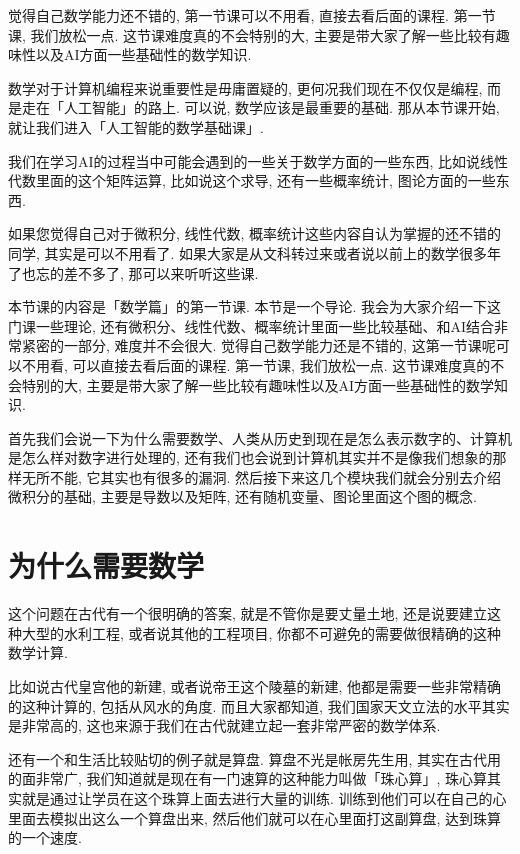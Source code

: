 觉得自己数学能力还不错的, 第一节课可以不用看, 直接去看后面的课程. 第一节课, 我们放松一点. 这节课难度真的不会特别的大, 主要是带大家了解一些比较有趣味性以及AI方面一些基础性的数学知识. 

数学对于计算机编程来说重要性是毋庸置疑的, 更何况我们现在不仅仅是编程, 而是走在「人工智能」的路上. 可以说, 数学应该是最重要的基础. 那从本节课开始, 就让我们进入「人工智能的数学基础课」. 

我们在学习AI的过程当中可能会遇到的一些关于数学方面的一些东西, 比如说线性代数里面的这个矩阵运算, 比如说这个求导, 还有一些概率统计, 图论方面的一些东西. 

如果您觉得自己对于微积分, 线性代数, 概率统计这些内容自认为掌握的还不错的同学, 其实是可以不用看了. 如果大家是从文科转过来或者说以前上的数学很多年了也忘的差不多了, 那可以来听听这些课. 

本节课的内容是「数学篇」的第一节课. 本节是一个导论. 我会为大家介绍一下这门课一些理论, 还有微积分、线性代数、概率统计里面一些比较基础、和AI结合非常紧密的一部分, 难度并不会很大. 觉得自己数学能力还是不错的, 这第一节课呢可以不用看, 可以直接去看后面的课程. 第一节课, 我们放松一点. 这节课难度真的不会特别的大, 主要是带大家了解一些比较有趣味性以及AI方面一些基础性的数学知识. 

首先我们会说一下为什么需要数学、人类从历史到现在是怎么表示数字的、计算机是怎么样对数字进行处理的, 还有我们也会说到计算机其实并不是像我们想象的那样无所不能, 它其实也有很多的漏洞. 然后接下来这几个模块我们就会分别去介绍微积分的基础, 主要是导数以及矩阵, 还有随机变量、图论里面这个图的概念. 

\section{为什么需要数学}

这个问题在古代有一个很明确的答案, 就是不管你是要丈量土地, 还是说要建立这种大型的水利工程, 或者说其他的工程项目, 你都不可避免的需要做很精确的这种数学计算. 

比如说古代皇宫他的新建, 或者说帝王这个陵墓的新建, 他都是需要一些非常精确的这种计算的, 包括从风水的角度. 而且大家都知道, 我们国家天文立法的水平其实是非常高的, 这也来源于我们在古代就建立起一套非常严密的数学体系. 

还有一个和生活比较贴切的例子就是算盘. 算盘不光是帐房先生用, 其实在古代用的面非常广, 我们知道就是现在有一门速算的这种能力叫做「珠心算」, 珠心算其实就是通过让学员在这个珠算上面去进行大量的训练. 训练到他们可以在自己的心里面去模拟出这么一个算盘出来, 然后他们就可以在心里面打这副算盘, 达到珠算的一个速度. 

